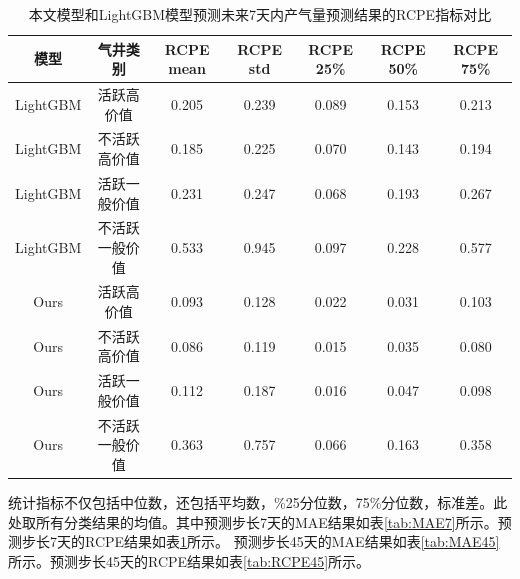 \begin{table}[H]
    \renewcommand{\arraystretch}{1.5}
    \centering
    \caption{本文模型和LightGBM模型预测未来7天内产气量预测结果的RCPE指标对比}
    \label{tab:RCPE7}
    \begin{tabular}{|c|c|c|c|c|c|c|} %
    \hline
    模型     & 气井类别 & RCPE mean & RCPE std & RCPE 25\% & RCPE 50\% & RCPE 75\% \\ \hline
    LightGBM & 活跃高价值        &0.205     & 0.239     &0.089      &0.153       &0.213 \\ \hline
    LightGBM & 不活跃高价值      & 0.185     & 0.225    & 0.070     & 0.143     & 0.194     \\ \hline
    LightGBM & 活跃一般价值     & 0.231     & 0.247    & 0.068     & 0.193     & 0.267     \\ \hline
    LightGBM & 不活跃一般价值      & 0.533     & 0.945    & 0.097     & 0.228     & 0.577     \\ \hline
    Ours      &活跃高价值         &0.093     & 0.128     &0.022      & 0.031      &0.103 \\ \hline
    Ours      & 不活跃高价值      & 0.086     & 0.119    & 0.015     & 0.035     & 0.080     \\ \hline
    Ours      & 活跃一般价值     & 0.112     & 0.187    & 0.016     & 0.047     & 0.098     \\ \hline
    Ours      & 不活跃一般价值      & 0.363     & 0.757    & 0.066     & 0.163     & 0.358     \\ \hline
    \end{tabular}
\end{table}
统计指标不仅包括中位数，还包括平均数，\%25分位数，75\%分位数，标准差。此处取所有分类结果的均值。其中预测步长7天的MAE结果如表\ref{tab:MAE7}所示。预测步长7天的RCPE结果如表\ref{tab:RCPE7}所示。
预测步长45天的MAE结果如表\ref{tab:MAE45}所示。预测步长45天的RCPE结果如表\ref{tab:RCPE45}所示。
